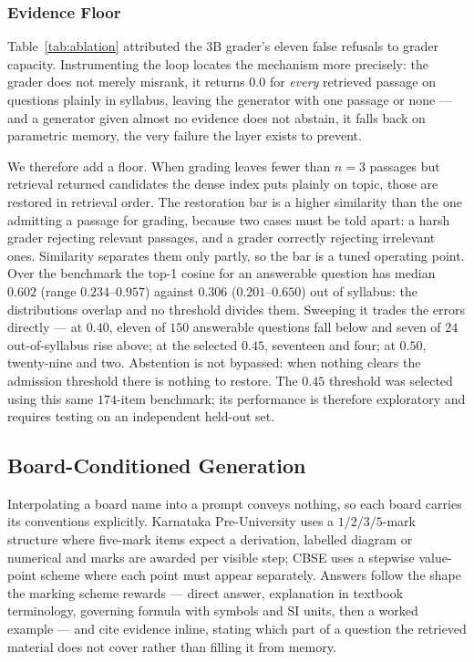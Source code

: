 \documentclass[conference]{IEEEtran}
\begin{document}
\subsubsection{Evidence Floor}
\label{sec:floor}
Table~\ref{tab:ablation} attributed the $3$B grader's eleven false refusals to
grader capacity. Instrumenting the loop locates the mechanism more precisely:
the grader does not merely misrank, it returns $0.0$ for \emph{every} retrieved
passage on questions plainly in syllabus, leaving the generator with one
passage or none --- and a generator given almost no evidence does not abstain,
it falls back on parametric memory, the very failure the layer exists to
prevent.

We therefore add a floor. When grading leaves fewer than $n=3$ passages but
retrieval returned candidates the dense index puts plainly on topic, those are
restored in retrieval order. The restoration bar is a higher similarity than
the one admitting a passage for grading, because two cases must be told apart:
a harsh grader rejecting relevant passages, and a grader correctly rejecting
irrelevant ones. Similarity separates them only partly, so the bar is a tuned
operating point. Over the benchmark the top-1 cosine for an answerable question
has median $0.602$ (range $0.234$--$0.957$) against $0.306$ ($0.201$--$0.650$)
out of syllabus: the distributions overlap and no threshold divides them.
Sweeping it trades the errors directly --- at $0.40$, eleven of $150$ answerable
questions fall below and seven of $24$ out-of-syllabus rise above; at the
selected $0.45$, seventeen and four; at $0.50$, twenty-nine and two. Abstention
is not bypassed: when nothing clears the admission threshold there is nothing
to restore. The $0.45$ threshold was selected using this same $174$-item
benchmark; its performance is therefore exploratory and requires testing on
an independent held-out set.

\subsection{Board-Conditioned Generation}
\label{sec:diagram}
Interpolating a board name into a prompt conveys nothing, so each board carries
its conventions explicitly. Karnataka Pre-University uses a $1/2/3/5$-mark
structure where five-mark items expect a derivation, labelled diagram or
numerical and marks are awarded per visible step; CBSE uses a stepwise
value-point scheme where each point must appear separately. Answers follow the
shape the marking scheme rewards --- direct answer, explanation in textbook
terminology, governing formula with symbols and SI units, then a worked example
--- and cite evidence inline, stating which part of a question the retrieved
material does not cover rather than filling it from memory.
\end{document}
